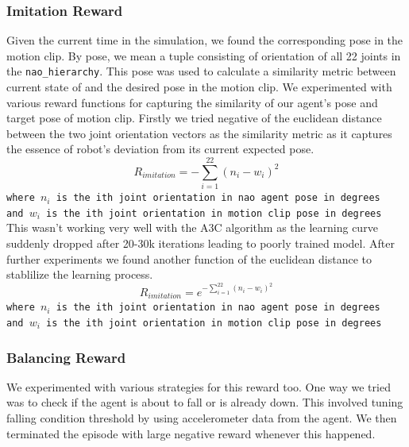 \subsubsection{Imitation Reward}
Given the current time in the simulation, we found the corresponding pose in the motion clip. By pose, we mean a tuple consisting of orientation of all 22 joints in the \texttt{nao\_hierarchy}. This pose was used to calculate a similarity metric between current state of and the desired pose in the motion clip. We experimented with various reward functions for capturing the similarity of our agent's pose and target pose of motion clip. Firstly we tried negative of the euclidean distance between the two joint orientation vectors as the similarity metric as it captures the essence of robot's deviation from its current expected pose. 
$$R_{imitation} = - \sum_{i=1}^{22} (n_i - w_i)^2$$
\texttt{where $n_i$ is the ith joint orientation in nao agent pose in degrees \\
and $w_i$ is the ith joint orientation in motion clip pose in degrees}
\vspace{1em}
\\
This wasn't working very well with the A3C algorithm as the learning curve suddenly dropped after 20-30k iterations leading to poorly trained model. After further experiments we found another function of the euclidean distance to stablilize the learning process. 
$$R_{imitation} = e^{- \sum_{i=1}^{22} (n_i - w_i)^2}$$
\texttt{where $n_i$ is the ith joint orientation in nao agent pose in degrees \\
and $w_i$ is the ith joint orientation in motion clip pose in degrees} 
\vspace{1em}
\\
\subsubsection{Balancing Reward}
We experimented with various strategies for this reward too. One way we tried was to check if the agent is about to fall or is already down. This involved tuning falling condition threshold by using accelerometer data from the agent. We then terminated the episode with large negative reward whenever this happened.  \\

